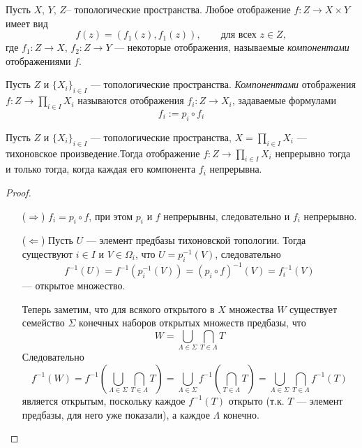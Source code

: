\documentclass[12pt,a4paper]{article}
\begin{document}
    \begin{definition}
        Пусть $X$, $Y$, $Z$– топологические пространства. Любое отображение $f: Z \to X \times Y$ имеет вид
        \[f(z) = (f_1(z), f_1(z)),\qquad \text{для всех $z \in Z$},\]
        где $f_1: Z \to X$, $f_2: Z \to Y$ --- некоторые отображения, называемые \emph{компонентами} отображениями $f$.
    \end{definition}

    \begin{definition}
        Пусть $Z$ и $\{X_i\}_{i \in I}$ --- топологические пространства. \emph{Компонентами} отображения $f: Z \to \prod_{i \in I} X_i$ называются отображения $f_i: Z \to X_i$, задаваемые формулами
        \[f_i := p_i \circ f_i\]
    \end{definition}

    \begin{theorem}
        Пусть $Z$ и $\{X_i\}_{i \in I}$ --- топологические пространства, $X = \prod_{i \in I} X_i$ --- тихоновское произведение.Тогда отображение $f: Z \to \prod_{i \in I} X_i$ непрерывно тогда и только тогда, когда каждая его компонента $f_i$ непрерывна.
    \end{theorem}

    \begin{proof}
        \begin{itemize}
            \item[($\Rightarrow$)] $f_i = p_i \circ f$, при этом $p_i$ и $f$ непрерывны, следовательно и $f_i$ непрерывно.
            \item[($\Leftarrow$)] Пусть $U$ --- элемент предбазы тихоновской топологии. Тогда существуют $i \in I$ и $V \in \Omega_i$, что $U = p_i^{-1}(V)$, следовательно
            \[f^{-1}(U) = f^{-1}(p_i^{-1}(V)) = (p_i \circ f)^{-1}(V) = f_i^{-1}(V)\]
            --- открытое множество.

            Теперь заметим, что для всякого открытого в $X$ множества $W$ существует семейство $\Sigma$ конечных наборов открытых множеств предбазы, что
            \[W = \bigcup_{\Lambda \in \Sigma} \bigcap_{T \in \Lambda} T\]
            Следовательно
            \[
                f^{-1}(W)
                = f^{-1}\left(\bigcup_{\Lambda \in \Sigma} \bigcap_{T \in \Lambda} T\right)
                = \bigcup_{\Lambda \in \Sigma} f^{-1}\left(\bigcap_{T \in \Lambda} T\right)
                = \bigcup_{\Lambda \in \Sigma} \bigcap_{T \in \Lambda} f^{-1}(T)
            \]
            является открытым, поскольку каждое $f^{-1}(T)$ открыто (т.к. $T$ --- элемент предбазы, для него уже показали), а каждое $\Lambda$ конечно.
        \end{itemize}
    \end{proof}
\end{document}

